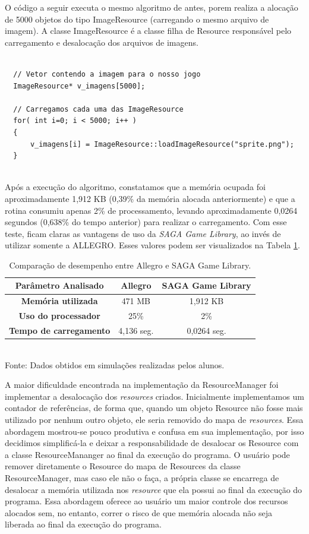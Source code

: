 \par 
O código a seguir executa o mesmo algoritmo de antes, porem realiza a alocação de 5000 objetos do tipo ImageResource (carregando o mesmo arquivo de imagem). A classe ImageResource é a classe filha de Resource responsável pelo carregamento e desalocação dos arquivos de imagens. 
%
%
\begin{lstlisting}

  // Vetor contendo a imagem para o nosso jogo
  ImageResource* v_imagens[5000];
	
  // Carregamos cada uma das ImageResource
  for( int i=0; i < 5000; i++ )
  {
      v_imagens[i] = ImageResource::loadImageResource("sprite.png");
  }
	      
\end{lstlisting}
%
\par 
Após a execução do algoritmo, constatamos que a memória ocupada foi aproximadamente 1,912 KB (0,39\% da memória alocada anteriormente) e que a rotina consumiu apenas 2\% de processamento, levando aproximadamente 0,0264 segundos (0,638\% do tempo anterior) para realizar o carregamento. Com esse teste, ficam claras as vantagens de uso da \textit{SAGA Game Library}, ao invés de utilizar somente a ALLEGRO. Esses valores podem ser visualizados na Tabela \ref{tabelaEconomia}.
%
% 
\begin{table}[H]
\centering
\caption{Comparação de desempenho entre Allegro e SAGA Game Library.}
\begin{tabular}{|c|c|c|}\hline
\textbf{Parâmetro Analisado} & \textbf{Allegro} & \textbf{SAGA Game Library}\\\hline
\textbf{Memória utilizada} & 471 MB & 1,912 KB\\\hline
\textbf{Uso do processador} & 25\% & 2\% \\\hline
\textbf{Tempo de carregamento} & 4,136 seg. & 0,0264 seg.\\\hline
\end{tabular}
\\Fonte: Dados obtidos em simulações realizadas pelos alunos.
\label{tabelaEconomia}
\end{table}
%
%
\par
A maior dificuldade encontrada na implementação da ResourceManager foi implementar a desalocação dos \textit{resources} criados. Inicialmente implementamos um contador de referências, de forma que, quando um objeto Resource não fosse mais utilizado por nenhum outro objeto, ele seria removido do mapa de \textit{resources}. Essa abordagem mostrou-se pouco produtiva e confusa em sua implementação, por isso decidimos simplificá-la e deixar a responsabilidade de desalocar os Resource com a classe ResourceMananger ao final da execução do programa. O usuário pode remover diretamente o Resource do mapa de Resources da classe ResourceManager, mas caso ele não o faça, a própria classe se encarrega de desalocar a memória utilizada nos \textit{resource} que ela possui ao final da execução do programa. Essa abordagem oferece ao usuário um maior controle dos recursos alocados sem, no entanto, correr o risco de que memória alocada não seja liberada ao final da execução do programa.
%
%
%
